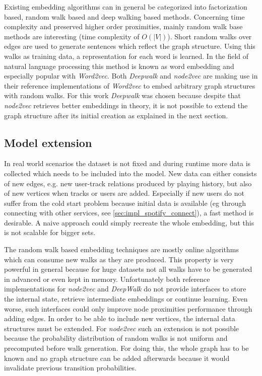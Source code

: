 \documentclass[a4paper]{llncs}
\begin{document}
	Existing embedding algorithms can in general be categorized into factorization based, random walk based and deep walking based methods. Concerning time complexity and preserved higher order proximities, mainly random walk base methods are interesting (time complexity of $ O(|V|) $). Short random walks over edges are used to generate sentences which reflect the graph structure. Using this walks as training data, a representation for each word is learned. In the field of natural language processing this method is known as word embedding and especially popular with \emph{Word2vec}\cite{mikolov2013efficient}. Both \emph{Deepwalk}\cite{perozzi2014deepwalk} and \emph{node2vec}\cite{grover2016node2vec} are making use in their reference implementations of \emph{Word2vec} to embed arbitrary graph structures with random walks. For this work \emph{Deepwalk} was chosen because despite that \emph{node2vec} retrieves better embeddings in theory, it is not possible to extend the graph structure after its initial creation as explained in the next section.
	
	\subsection{Model extension}
	In real world scenarios the dataset is not fixed and during runtime more data is collected which needs to be included into the model. New data can either consists of new edges, e.g. new user-track relations produced by playing history, but also of new vertices when tracks or users are added. Especially if new users do not suffer from the cold start problem because initial data is available (eg through connecting with other services, see \ref{sec:impl_spotify_connect}), a fast method is desirable. A naive approach could simply recreate the whole embedding, but this is not scalable for bigger sets. 
	
	The random walk based embedding techniques are mostly online algorithms which can consume new walks as they are produced. This property is very powerful in general because for huge datasets not all walks have to be generated in advanced or even kept in memory. Unfortunately both reference implementations for \emph{node2vec} and \emph{DeepWalk} do not provide interfaces to store the internal state, retrieve intermediate embeddings or continue learning. Even worse, such interfaces could only improve node proximities performance through adding edges. In order to be able to include new vertices, the internal data structures must be extended. For \emph{node2vec} such an extension is not possible because the probability distribution of random walks is not uniform and precomputed before walk generation. For doing this, the whole graph has to be known and no graph structure can be added afterwards because it would invalidate previous transition probabilities.
	
\end{document}
